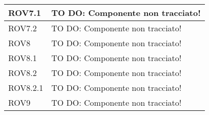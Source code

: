 \begin{center}
\begin{longtable}{| p{4cm} | p{8cm} |}
\hline
ROV7.1 & TO DO: Componente non tracciato! \\
\hline
ROV7.2 & TO DO: Componente non tracciato! \\
\hline
ROV8 & TO DO: Componente non tracciato! \\
\hline
ROV8.1 & TO DO: Componente non tracciato! \\
\hline
ROV8.2 & TO DO: Componente non tracciato! \\
\hline
ROV8.2.1 & TO DO: Componente non tracciato! \\
\hline
ROV9 & TO DO: Componente non tracciato! \\
\hline
\end{longtable}
\egroup
\end{center}
